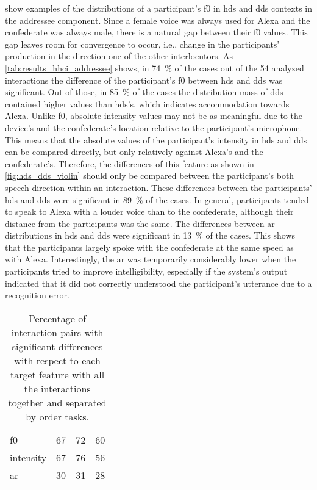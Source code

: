  show examples of the distributions of a participant's \ac{f0} in \ac{hds} and \ac{dds} contexts in the addressee component.
Since a female voice was always used for Alexa and the confederate was always male, there is a natural gap between their \ac{f0} values.
This gap leaves room for convergence to occur, i.e., change in the participants' production in the direction one of the other interlocutors.
As \cref{tab:results_hhci_addressee} shows, in \SI{74}{\percent} of the cases out of the 54 analyzed interactions the difference of the participant's \ac{f0} between \ac{hds} and \ac{dds} was significant.
Out of those, in \SI{85}{\percent} of the cases the distribution mass of \ac{dds} contained higher values than \ac{hds}'s, which indicates accommodation towards Alexa.
Unlike \ac{f0}, absolute intensity values may not be as meaningful due to the device's and the confederate's location relative to the participant's microphone.
This means that the absolute values of the participant's intensity in \ac{hds} and \ac{dds} can be compared directly, but only relatively against Alexa's and the confederate's.
Therefore, the differences of this feature as shown in \cref{fig:hds_dds_violin} should only be compared between the participant's both speech direction within an interaction.
These differences between the participants' \ac{hds} and \ac{dds} were significant in \SI{89}{\percent} of the cases.
In general, participants tended to speak to Alexa with a louder voice than to the confederate, although their distance from the participants was the same.
The differences between \ac{ar} distributions in \ac{hds} and \ac{dds} were significant in \SI{13}{\percent} of the cases.
This shows that the participants largely spoke with the confederate at the same speed as with Alexa.
Interestingly, the \ac{ar} was temporarily considerably lower when the participants tried to improve intelligibility, especially if the system's output indicated that it did not correctly understood the participant's utterance due to a recognition error.
%
\begin{table}
	\centering
	\caption[Percentage of significantly different interaction pairs in the addressee component]
		{Percentage of interaction pairs with significant differences with respect to each target feature with all the interactions together and separated by order tasks.}
	\label{tab:signif_conditions}
	\begin{tabularx}{\linewidth}{XSSS}
		\toprule
		 & {} & {}	& {}\\
		\midrule
		\acs{f0}	& 67	& 72	& 60 \\
		intensity 	& 67	& 76	& 56 \\
		\acs{ar}	& 30	& 31	& 28 \\
		\bottomrule	
	\end{tabularx}
\end{table}
